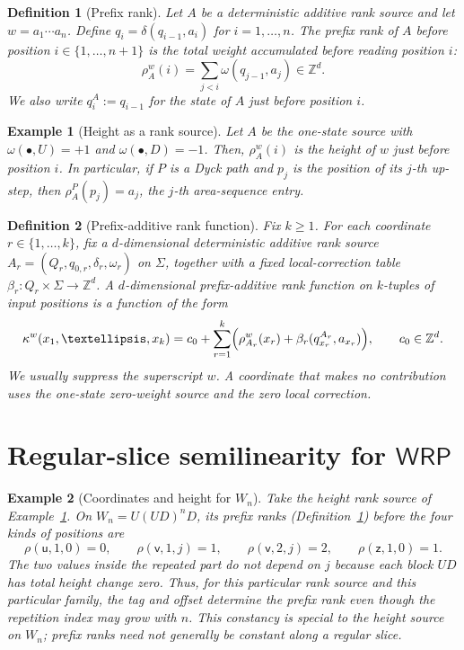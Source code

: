 \documentclass[10pt,a4paper]{amsart}
\newtheorem{definition}{Definition}
\newtheorem{example}{Example}
\newcommand{\WRP}{\mathsf{WRP}}
\newcommand{\Z}{\mathbb Z}
\begin{document}
\begin{definition}[Prefix rank]\label{def:prefix-rank}
Let $A$ be a deterministic additive rank source and let
$w=a_1\cdots a_n$.  Define
$q_i=\delta(q_{i-1},a_i)$ for $i=1,\ldots,n$.  The \emph{prefix rank} of $A$
before position $i\in\{1,\ldots,n+1\}$ is the total weight accumulated before
reading position $i$:
\[
   \rho_A^w(i)=\sum_{j<i}\omega(q_{j-1},a_j)\in\Z^d.
\]
We also write $q^A_i:=q_{i-1}$ for the state of $A$ just before position $i$.
\end{definition}

\begin{example}[Height as a rank source]\label{ex:height-rank}
Let $A$ be the one-state source with
$\omega(\bullet,U)=+1$ and $\omega(\bullet,D)=-1$.  Then, $\rho_A^w(i)$ is the
height of $w$ just before position $i$.  In particular, if $P$ is a Dyck path
and $p_j$ is the position of its $j$-th up-step, then
$\rho_A^P(p_j)=a_j$, the $j$-th area-sequence entry.
\end{example}

\begin{definition}[Prefix-additive rank function]
\label{def:prefix-additive-rank}
Fix $k\ge 1$.  For each coordinate $r\in\{1,\ldots,k\}$, fix a
$d$-dimensional deterministic additive rank source
$A_r=(Q_r,q_{0,r},\delta_r,\omega_r)$ on $\Sigma$, together with a fixed
local-correction table
$\beta_r\colon Q_r\times\Sigma\to\Z^d$.  A
\emph{$d$-dimensional prefix-additive rank function} on $k$-tuples of input
positions is a function of the form
\[
   \kappa^w(x_1,\ldots,x_k)
   =c_0+\sum_{r=1}^{k}
       \Bigl(\rho_{A_r}^w(x_r)
             +\beta_r(q^{A_r}_{x_r},a_{x_r})\Bigr),
   \qquad c_0\in\Z^d.
\]
We usually suppress the superscript $w$.  A coordinate that makes no
contribution uses the one-state zero-weight source and the zero local
correction.
\end{definition}

\section[Regular-slice semilinearity for WRP]{Regular-slice semilinearity for $\WRP$}\label{sec:slice-semilinearity}

\begin{example}[Coordinates and height for $W_n$]
\label{ex:slice-coordinates}
Take the height rank source of Example~\ref{ex:height-rank}.  On
$W_n=U(UD)^nD$, its prefix ranks (Definition~\ref{def:prefix-rank}) before the
four kinds of positions are
\[
   \rho(\mathsf u,1,0)=0,\qquad
   \rho(\mathsf v,1,j)=1,\qquad
   \rho(\mathsf v,2,j)=2,\qquad
   \rho(\mathsf z,1,0)=1.
\]
The two values inside the repeated part do not depend on $j$ because each
block $UD$ has total height change zero.  Thus, for this particular rank source
and this particular family, the tag and offset determine the prefix rank even
though the repetition index may grow with $n$.  This constancy is special to
the height source on $W_n$; prefix ranks need not generally be constant along
a regular slice.
\end{example}
\end{document}
